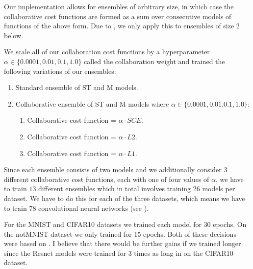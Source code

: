 \documentclass[english,a4paper,oneside]{amsart}
\theoremstyle{definition}
\begin{document}
Our implementation allows for ensembles of arbitrary size, in which case the collaborative cost functions are formed as a sum over consecutive models of functions of the above form. Due to , we only apply this to ensembles of size 2 below.

We scale all of our collaboration cost functions by a hyperparameter $\alpha \in \{0.0001, 0.01, 0.1, 1.0\}$ called the collaboration weight and trained the following variations of our ensembles:
\begin{enumerate}
	\item Standard ensemble of ST and M models.
	\item Collaborative ensemble of ST and M models where $\alpha \in \{0.0001, 0.01. 0.1, 1.0\}$:
	\begin{enumerate}
		\item Collaborative cost function = $\alpha \cdot SCE$.
		\item Collaborative cost function = $\alpha \cdot L2$.
		\item Collaborative cost function = $\alpha \cdot  L1$.
	\end{enumerate}
\end{enumerate}

Since each ensemble consists of two models and we additionally consider 3 different collaborative cost functions, each with one of four values of $\alpha$, we have to train $13$ different ensembles which in total involves training 26 models per dataset. We have to do this for each of the three datasets, which means we have to train 78 convolutional neural networks (see ).

For the MNIST and CIFAR10 datasets we trained each model for 30 epochs. On the notMNIST dataset we only trained for 15 epochs. Both of these decisions were based on . I believe that there would be further gains if we trained longer since the Resnet models were trained for 3 times as long in \cite{ResNet} on the CIFAR10 dataset.


\end{document}

